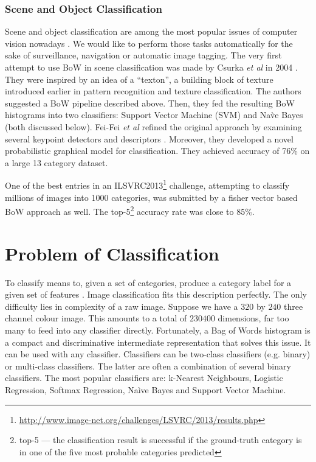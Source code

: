 		\subsubsection{Scene and Object Classification}
		Scene and object classification are among the most popular issues of computer vision nowadays . We would like to perform those tasks automatically for the sake of surveillance, navigation or automatic image tagging. The very first attempt to use BoW in scene classification was made by Csurka \textit{et al} in 2004 \cite{csurka2004visual}. They were inspired by an idea of a ``texton'', a building block of texture introduced earlier in pattern recognition and texture classification. The authors suggested a BoW pipeline described above. Then, they fed the resulting BoW histograms into two classifiers: Support Vector Machine (SVM) and Na\`ve Bayes (both discussed below). Fei-Fei \emph{et al} refined the original approach by examining several keypoint detectors and descriptors \cite{fei2005bayesian}. Moreover, they developed a novel probabilistic graphical model for classification. They achieved accuracy of 76\% on a large 13 category dataset. 
		
		One of the best entries in an ILSVRC2013\footnote{\url{http://www.image-net.org/challenges/LSVRC/2013/results.php}} challenge, attempting to classify millions of images into 1000 categories, was submitted by a fisher vector based BoW approach as well. The top-5\footnote{top-5 --- the classification result is successful if the ground-truth category is in one of the five most probable categories predicted} accuracy rate was close to 85\%.
		
\section{Problem of Classification}

	To classify means to, given a set of categories, produce a category label for a given set of features \cite{ponce2011cv}. Image classification fits this description perfectly. The only difficulty lies in complexity of a raw image. Suppose we have a $320$ by $240$ three channel colour image. This amounts to a total of $230400$ dimensions, far too many to feed into any classifier directly. Fortunately, a Bag of Words histogram is a compact and discriminative intermediate representation that solves this issue. It can be used with any classifier. Classifiers can be two-class classifiers (e.g. binary) or multi-class classifiers. The latter are often a combination of several binary classifiers. The most popular classifiers are: k-Nearest Neighbours, Logistic Regression, Softmax Regression, Na\`ive Bayes and Support Vector Machine.
	
